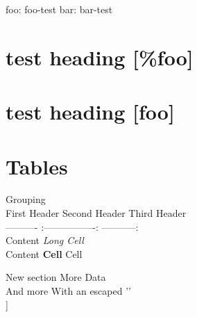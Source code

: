 foo: foo-test
bar: bar-test

\part{test heading [\%foo]}
\label{testheading}

\part{test heading [foo]}
\label{testheading}

\part{Tables}
\label{tables}

\textbar{} \textbar{} Grouping \textbar{}\textbar{}\\
First Header \textbar{} Second Header \textbar{} Third Header \textbar{}\\
\textbar{} ---------- \textbar{} :----------------: \textbar{} -----------: \textbar{}\\
Content \textbar{} \emph{Long Cell} \textbar{}\textbar{}\\
Content \textbar{} \textbf{Cell} \textbar{} Cell \textbar{} 

New section \textbar{} More \textbar{} Data \textbar{}\\
And more \textbar{} With an escaped '\textbar{}' \textbar{}\textbar{}\\
[Prototype table caption [\%foo]] 
